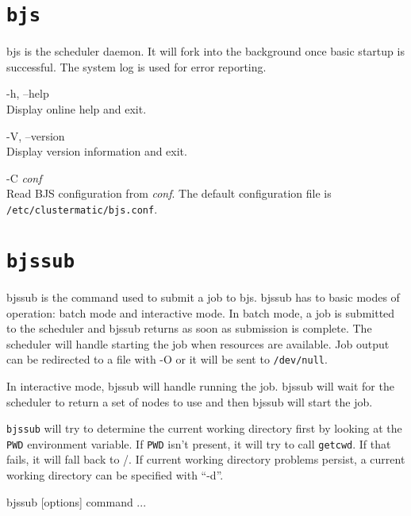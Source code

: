 \documentclass[oneside]{book}
\begin{document}
\section{\texttt{bjs}}

bjs is the scheduler daemon.  It will fork into the background once
basic startup is successful.  The system log is used for error
reporting.

\begin{description}
\item{-h, --help}\\
  Display online help and exit.

\item{-V, --version}\\
  Display version information and exit.

\item{-C \textit{conf}}\\
  Read BJS configuration from \textit{conf}.  The default
  configuration file is \texttt{/etc/clustermatic/bjs.conf}.
\end{description}


\section{\texttt{bjssub}}
\label{bjssub}

bjssub is the command used to submit a job to bjs.  bjssub has to
basic modes of operation: batch mode and interactive mode.  In batch
mode, a job is submitted to the scheduler and bjssub returns as soon
as submission is complete.  The scheduler will handle starting the job
when resources are available.  Job output can be redirected to a file
with -O or it will be sent to \texttt{/dev/null}.

In interactive mode, bjssub will handle running the job.  bjssub will
wait for the scheduler to return a set of nodes to use and then bjssub
will start the job.

\texttt{bjssub} will try to determine the current working directory
first by looking at the \texttt{PWD} environment variable.  If
\texttt{PWD} isn't present, it will try to call \texttt{getcwd}.  If
that fails, it will fall back to /.  If current working directory
problems persist, a current working directory can be specified with
``-d''.

bjssub [options] command ...
\end{document}
